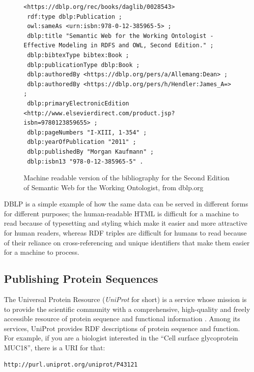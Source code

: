 \begin{figure}
\begin{lstlisting}
<https://dblp.org/rec/books/daglib/0028543>
 rdf:type dblp:Publication ;
 owl:sameAs <urn:isbn:978-0-12-385965-5> ;
 dblp:title "Semantic Web for the Working Ontologist - Effective Modeling in RDFS and OWL, Second Edition." ;
 dblp:bibtexType bibtex:Book ;
 dblp:publicationType dblp:Book ;
 dblp:authoredBy <https://dblp.org/pers/a/Allemang:Dean> ;
 dblp:authoredBy <https://dblp.org/pers/h/Hendler:James_A=> ;
 dblp:primaryElectronicEdition <http://www.elsevierdirect.com/product.jsp?isbn=9780123859655> ;
 dblp:pageNumbers "I-XIII, 1-354" ;
 dblp:yearOfPublication "2011" ;
 dblp:publishedBy "Morgan Kaufmann" ;
 dblp:isbn13 "978-0-12-385965-5" .
\end{lstlisting}
    \caption{Machine readable version of the bibliography for the Second Edition of Semantic Web for the Working Ontologist, from dblp.org}
    \label{fig:ch5.4}
\end{figure}

DBLP is a simple example of how the same data can be served in different forms for different
purposes; the human-readable HTML is difficult for a machine to read because of typesetting and styling
which make it easier and more attractive for human readers, whereas RDF triples are difficult for
humans to read because of their reliance on cross-referencing and unique identifiers that make them
easier for a machine to process. 

\subsection{Publishing Protein Sequences}

The Universal Protein Resource (\emph{UniProt} for short) is a service whose mission is to 
provide the scientific community 
with a comprehensive, high-quality and freely accessible resource of protein sequence and 
functional information \cite{10.1093/nar/gky1049}. 
Among its services, UniProt  provides RDF descriptions of protein sequence and
function. For example, if you are a biologist interested in the ``Cell surface
glycoprotein MUC18'', there is a URI for that:

\begin{lstlisting}
http://purl.uniprot.org/uniprot/P43121
\end{lstlisting}


